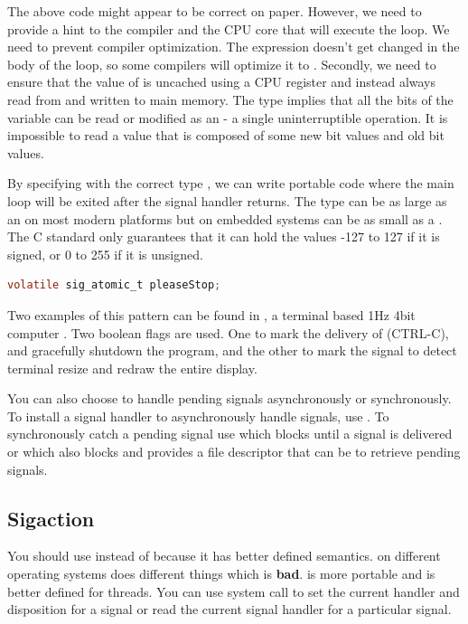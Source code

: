 The above code might appear to be correct on paper.
However, we need to provide a hint to the compiler and the CPU core that will execute the  loop.
We need to prevent compiler optimization.
The expression  doesn't get changed in the body of the loop, so some compilers will optimize it to  .
Secondly, we need to ensure that the value of  is uncached using a CPU register and instead always read from and written to main memory.
The  type implies that all the bits of the variable can be read or modified as an  - a single uninterruptible operation.
It is impossible to read a value that is composed of some new bit values and old bit values.

By specifying  with the correct type , we can write portable code where the main loop will be exited after the signal handler returns.
The  type can be as large as an  on most modern platforms but on embedded systems can be as small as a .
The C standard only guarantees that it can hold the values -127 to 127 if it is signed, or 0 to 255 if it is unsigned.

\begin{lstlisting}[language=C]
volatile sig_atomic_t pleaseStop;
\end{lstlisting}

Two examples of this pattern can be found in , a terminal based 1Hz 4bit computer \cite{Sorn_2015}.
Two boolean flags are used.
One to mark the delivery of  (CTRL-C), and gracefully shutdown the program, and the other to mark the  signal to detect terminal resize and redraw the entire display.

You can also choose to handle pending signals asynchronously or synchronously.
To install a signal handler to asynchronously handle signals, use .
To synchronously catch a pending signal use  which blocks until a signal is delivered or  which also blocks and provides a file descriptor that can be  to retrieve pending signals.

\subsection{Sigaction}

You should use  instead of  because it has better defined semantics.
 on different operating systems does different things which is \textbf{bad}.
 is more portable and is better defined for threads.
You can use system call  to set the current handler and disposition for a signal or read the current signal handler for a particular signal.

